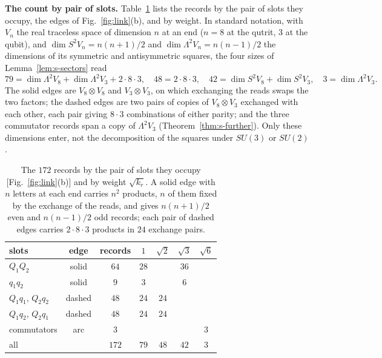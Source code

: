 \textbf{The count by pair of slots.} Table~\ref{tab:s-slotpairs} lists the records by the pair of slots they occupy, the edges of Fig.~\ref{fig:link}(b), and by weight. In standard notation, with $V_{n}$ the real traceless space of dimension $n$ at an end ($n=8$ at the qutrit, $3$ at the qubit), and $\dim S^{2}V_{n}=n(n+1)/2$ and $\dim\Lambda^{2}V_{n}=n(n-1)/2$ the dimensions of its symmetric and antisymmetric squares, the four sizes of Lemma~\ref{lem:s-sectors} read
\begin{equation*}
79=\dim\Lambda^{2}V_{8}+\dim\Lambda^{2}V_{3}+2\cdot 8\cdot 3,\quad
48=2\cdot 8\cdot 3,\quad
42=\dim S^{2}V_{8}+\dim S^{2}V_{3},\quad
3=\dim\Lambda^{2}V_{3}.
\end{equation*}
The solid edges are $V_{8}\otimes V_{8}$ and $V_{3}\otimes V_{3}$, on which exchanging the reads swaps the two factors; the dashed edges are two pairs of copies of $V_{8}\otimes V_{3}$ exchanged with each other, each pair giving $8\cdot 3$ combinations of either parity; and the three commutator records span a copy of $\Lambda^{2}V_{3}$ (Theorem~\ref{thm:s-further}). Only these dimensions enter, not the decomposition of the squares under $SU(3)$ or $SU(2)$.

\begin{table}[h]
\caption{The $172$ records by the pair of slots they occupy [Fig.~\ref{fig:link}(b)] and by weight $\sqrt{k_{r}}$. A solid edge with $n$ letters at each end carries $n^{2}$ products, $n$ of them fixed by the exchange of the reads, and gives $n(n+1)/2$ even and $n(n-1)/2$ odd records; each pair of dashed edges carries $2\cdot 8\cdot 3$ products in $24$ exchange pairs.}
\label{tab:s-slotpairs}
\begin{ruledtabular}
\begin{tabular}{lcccccc}
slots & edge & records & $1$ & $\sqrt{2}$ & $\sqrt{3}$ & $\sqrt{6}$ \\ \hline
$Q_{1}Q_{2}$ & solid & $64$ & $28$ & & $36$ & \\
$q_{1}q_{2}$ & solid & $9$ & $3$ & & $6$ & \\
$Q_{1}q_{1}$, $Q_{2}q_{2}$ & dashed & $48$ & $24$ & $24$ & & \\
$Q_{1}q_{2}$, $Q_{2}q_{1}$ & dashed & $48$ & $24$ & $24$ & & \\
commutators & arc & $3$ & & & & $3$ \\ \hline
all & & $172$ & $79$ & $48$ & $42$ & $3$ \\
\end{tabular}
\end{ruledtabular}
\end{table}

